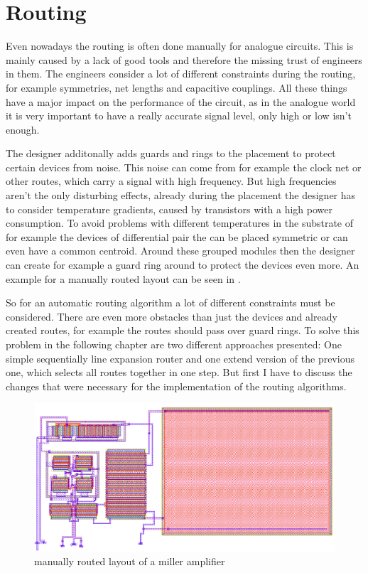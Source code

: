 \chapter{Routing}

Even nowadays the routing is often done manually for analogue circuits. This is mainly caused by a lack of good tools and therefore the missing trust of engineers in them. The engineers consider a lot of different constraints during the routing, for example symmetries, net lengths and capacitive couplings. All these things have a major impact on the performance of the circuit, as in the analogue world it is very important to have a really accurate signal level, only high or low isn't enough.

The designer additonally adds guards and rings to the placement to protect certain devices from noise. This noise can come from for example the clock net or other routes, which carry a signal with high frequency. But high frequencies aren't the only disturbing effects, already during the placement the designer has to consider temperature gradients, caused by transistors with a high power consumption. To avoid problems with different temperatures in the substrate of for example the devices of differential pair the can be placed symmetric or can even have a common centroid. Around these grouped modules then the designer can create for example a guard ring around to protect the devices even more. An example for a manually routed layout can be seen in .

So for an automatic routing algorithm a lot of different constraints must be considered. There are even more obstacles than just the devices and already created routes, for example the routes should pass over guard rings. To solve this problem in the following chapter are two different approaches presented: One simple sequentially line expansion router and one extend version of the previous one, which selects all routes together in one step. But first I have to discuss the changes that were necessary for the implementation of the routing algorithms.

\begin{figure}
	\centering
	\includegraphics[scale=.4]{FIG/miller_amplifier_layout_routed.png}
  	\caption{manually routed layout of a miller amplifier}
	\label{fig:miller_amplifier_routed_layout}
\end{figure}

